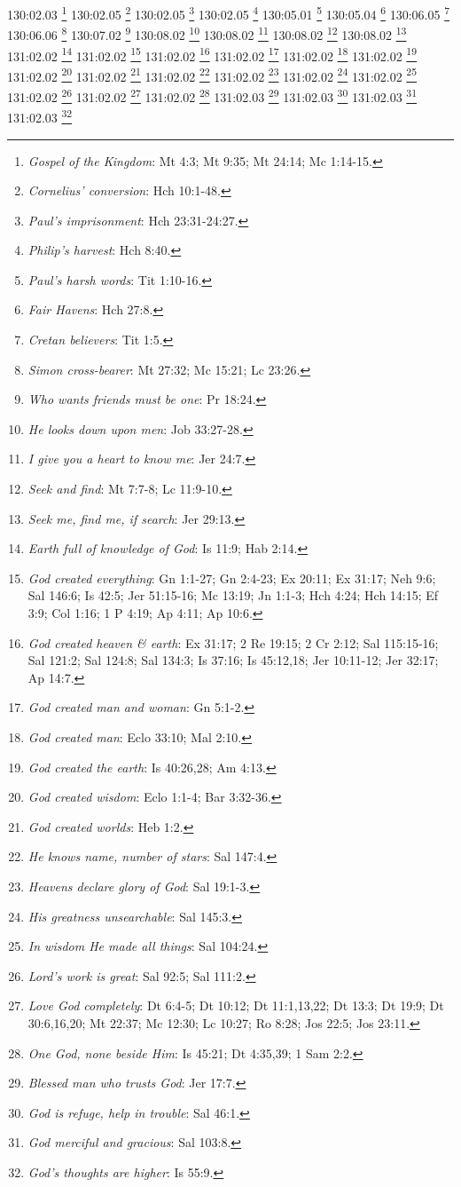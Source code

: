 {{{{{{{{{{{{{{{{{{{{{{{{{{{{{{{130:02.03 \footnote{\textit{Gospel of the Kingdom}: Mt 4:3; Mt 9:35; Mt 24:14; Mc 1:14-15.}
130:02.05 \footnote{\textit{Cornelius' conversion}: Hch 10:1-48.}
130:02.05 \footnote{\textit{Paul's imprisonment}: Hch 23:31-24:27.}
130:02.05 \footnote{\textit{Philip's harvest}: Hch 8:40.}
130:05.01 \footnote{\textit{Paul's harsh words}: Tit 1:10-16.}
130:05.04 \footnote{\textit{Fair Havens}: Hch 27:8.}
130:06.05 \footnote{\textit{Cretan believers}: Tit 1:5.}
130:06.06 \footnote{\textit{Simon cross-bearer}: Mt 27:32; Mc 15:21; Lc 23:26.}
130:07.02 \footnote{\textit{Who wants friends must be one}: Pr 18:24.}
130:08.02 \footnote{\textit{He looks down upon men}: Job 33:27-28.}
130:08.02 \footnote{\textit{I give you a heart to know me}: Jer 24:7.}
130:08.02 \footnote{\textit{Seek and find}: Mt 7:7-8; Lc 11:9-10.}
130:08.02 \footnote{\textit{Seek me, find me, if search}: Jer 29:13.}
131:02.02 \footnote{\textit{Earth full of knowledge of God}: Is 11:9; Hab 2:14.}
131:02.02 \footnote{\textit{God created everything}: Gn 1:1-27; Gn 2:4-23; Ex 20:11; Ex 31:17; Neh 9:6; Sal 146:6; Is 42:5; Jer 51:15-16; Mc 13:19; Jn 1:1-3; Hch 4:24; Hch 14:15; Ef 3:9; Col 1:16; 1 P 4:19; Ap 4:11; Ap 10:6.}
131:02.02 \footnote{\textit{God created heaven & earth}: Ex 31:17; 2 Re 19:15; 2 Cr 2:12; Sal 115:15-16; Sal 121:2; Sal 124:8; Sal 134:3; Is 37:16; Is 45:12,18; Jer 10:11-12; Jer 32:17; Ap 14:7.}
131:02.02 \footnote{\textit{God created man and woman}: Gn 5:1-2.}
131:02.02 \footnote{\textit{God created man}: Eclo 33:10; Mal 2:10.}
131:02.02 \footnote{\textit{God created the earth}: Is 40:26,28; Am 4:13.}
131:02.02 \footnote{\textit{God created wisdom}: Eclo 1:1-4; Bar 3:32-36.}
131:02.02 \footnote{\textit{God created worlds}: Heb 1:2.}
131:02.02 \footnote{\textit{He knows name, number of stars}: Sal 147:4.}
131:02.02 \footnote{\textit{Heavens declare glory of God}: Sal 19:1-3.}
131:02.02 \footnote{\textit{His greatness unsearchable}: Sal 145:3.}
131:02.02 \footnote{\textit{In wisdom He made all things}: Sal 104:24.}
131:02.02 \footnote{\textit{Lord's work is great}: Sal 92:5; Sal 111:2.}
131:02.02 \footnote{\textit{Love God completely}: Dt 6:4-5; Dt 10:12; Dt 11:1,13,22; Dt 13:3; Dt 19:9; Dt 30:6,16,20; Mt 22:37; Mc 12:30; Lc 10:27; Ro 8:28; Jos 22:5; Jos 23:11.}
131:02.02 \footnote{\textit{One God, none beside Him}: Is 45:21; Dt 4:35,39; 1 Sam 2:2.}
131:02.03 \footnote{\textit{Blessed man who trusts God}: Jer 17:7.}
131:02.03 \footnote{\textit{God is refuge, help in trouble}: Sal 46:1.}
131:02.03 \footnote{\textit{God merciful and gracious}: Sal 103:8.}
131:02.03 \footnote{\textit{God's thoughts are higher}: Is 55:9.}
}}}}}}}}}}}}}}}}}}}}}}}}}}}}}}}
